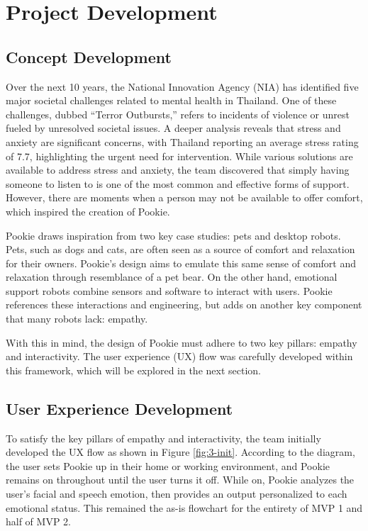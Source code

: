 \section{Project Development}
\subsection{Concept Development}
Over the next 10 years, the National Innovation Agency (NIA) has identified five major societal challenges related to mental health in Thailand. One of these challenges, dubbed “Terror Outbursts,” refers to incidents of violence or unrest fueled by unresolved societal issues. A deeper analysis reveals that stress and anxiety are significant concerns, with Thailand reporting an average stress rating of 7.7, highlighting the urgent need for intervention. While various solutions are available to address stress and anxiety, the team discovered that simply having someone to listen to is one of the most common and effective forms of support. However, there are moments when a person may not be available to offer comfort, which inspired the creation of Pookie.

Pookie draws inspiration from two key case studies: pets and desktop robots. Pets, such as dogs and cats, are often seen as a source of comfort and relaxation for their owners. Pookie’s design aims to emulate this same sense of comfort and relaxation through resemblance of a pet bear. On the other hand, emotional support robots combine sensors and software to interact with users. Pookie references these interactions and engineering, but adds on another key component that many robots lack: empathy.

With this in mind, the design of Pookie must adhere to two key pillars: empathy and interactivity. The user experience (UX) flow was carefully developed within this framework, which will be explored in the next section.

\subsection{User Experience Development}
\label{sec:ux}
To satisfy the key pillars of empathy and interactivity, the team initially developed the UX flow as shown in Figure \ref{fig:3-init}. According to the diagram, the user sets Pookie up in their home or working environment, and Pookie remains on throughout until the user turns it off. While on, Pookie analyzes the user’s facial and speech emotion, then provides an output personalized to each emotional status. This remained the as-is flowchart for the entirety of MVP 1 and half of MVP 2.

